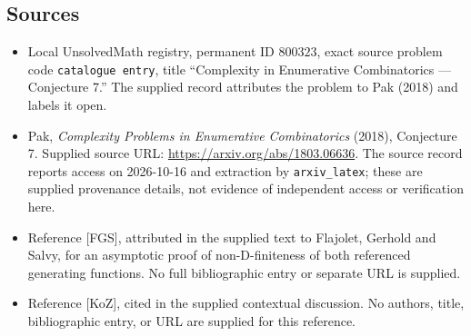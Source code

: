 \documentclass[11pt]{article}
\begin{document}
\subsection{Sources}
\begin{itemize}
\item Local UnsolvedMath registry, permanent ID \(800323\), exact source problem code \texttt{catalogue entry}, title ``Complexity in Enumerative Combinatorics --- Conjecture 7.'' The supplied record attributes the problem to Pak (2018) and labels it open.
\item Pak, \emph{Complexity Problems in Enumerative Combinatorics} (2018), Conjecture 7. Supplied source URL: \url{https://arxiv.org/abs/1803.06636}. The source record reports access on 2026-10-16 and extraction by \texttt{arxiv\_latex}; these are supplied provenance details, not evidence of independent access or verification here.
\item Reference [FGS], attributed in the supplied text to Flajolet, Gerhold and Salvy, for an asymptotic proof of non-D-finiteness of both referenced generating functions. No full bibliographic entry or separate URL is supplied.
\item Reference [KoZ], cited in the supplied contextual discussion. No authors, title, bibliographic entry, or URL are supplied for this reference.
\end{itemize}
\end{document}

